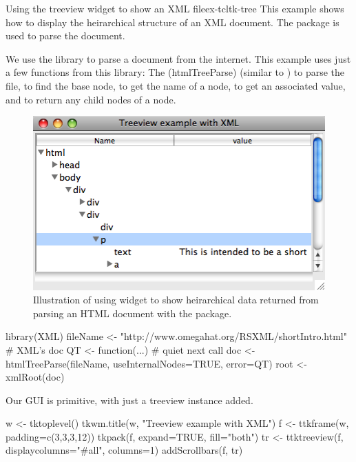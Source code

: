 \begin{example}{Using the treeview widget to show an XML file}{ex-tcltk-tree}
This example shows how to display the heirarchical structure of an XML
document. The  package is used to parse the document.


We use the  library to parse a document from the
internet. This example uses just a few functions from this library:
The \function(htmlTreeParse) (similar to ) to parse the file, 
 to find the base node,
 to get the name of a node, 
 to get an associated value, and
 to return any child nodes of a node.



\begin{figure}
  \centering
  \includegraphics[width=.7\textwidth]{fig-tcltk-xml-viewer.png}
  \caption{Illustration of using  widget to show
    heirarchical data returned from parsing an HTML document with the
     package.}
  \label{fig:fig-tcltk-xml-viewer}
\end{figure}
\begin{Schunk}
\begin{Sinput}
 library(XML)
 fileName <- "http://www.omegahat.org/RSXML/shortIntro.html" # XML's doc
 QT <- function(...) {}  # quiet next call
 doc <- htmlTreeParse(fileName, useInternalNodes=TRUE, error=QT)
 root <- xmlRoot(doc)
\end{Sinput}
\end{Schunk}
Our GUI is primitive, with just a treeview instance added.
\begin{Schunk}
\begin{Sinput}
 w <- tktoplevel()
 tkwm.title(w, "Treeview example with XML")
 f <- ttkframe(w, padding=c(3,3,3,12))
 tkpack(f, expand=TRUE, fill="both")
 tr <- ttktreeview(f, displaycolumns="#all", columns=1)
 addScrollbars(f, tr)                    
\end{Sinput}
\end{Schunk}


\end{example}
